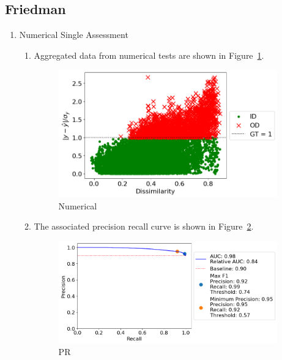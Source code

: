 \subsection{Friedman}

\begin{enumerate}
    \item Numerical Single Assessment

    \begin{enumerate}

        \item Aggregated data from numerical tests are shown in Figure~\ref{friedman_single}.

        \begin{figure}[H]
        \centering
        \includegraphics[width=0.95\textwidth]{figures/friedman_single.png}
        \caption{Numerical}
        \label{friedman_single}
        \end{figure}

        \item The associated precision recall curve is shown in Figure~\ref{friedman_single_pr}.

        \begin{figure}[H]
        \centering
        \includegraphics[width=0.95\textwidth]{figures/friedman_single_pr.png}
        \caption{PR}
        \label{friedman_single_pr}
        \end{figure}
    \end{enumerate}


\end{enumerate}
